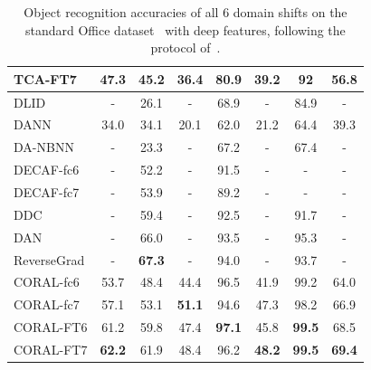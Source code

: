 \documentclass[letterpaper]{article}
\begin{document}
\begin{table}[t]
\begin{center}
{\begin{tabular}{|l||c|c|c|c|c|c|c|}
\hline
TCA-FT7	&47.3	&45.2	&36.4	&80.9	&39.2	&92 &56.8 \\
\hline
\hline
DLID	&-&	26.1&-&		68.9&-&84.9&-\\
\hline
DANN &34.0	&34.1&	20.1&	62.0&	21.2&	64.4&39.3\\
\hline
DA-NBNN	&-	&23.3&	-&	67.2&	-&	67.4&-\\
\hline
DECAF-fc6  &-	&52.2&	-&	91.5&	-&	-&-\\
\hline
DECAF-fc7  &-	&53.9&	-&	89.2&	-&	-&-\\
\hline
DDC	 &-	&59.4	&-	&92.5	&-	&91.7  &- \\
\hline
DAN	 &-	&66.0	&-	&93.5	&-	&95.3  &- \\
\hline
ReverseGrad	 &-	&\textbf{67.3}	&-	&94.0	&-	&93.7  &- \\
\hline
\hline
CORAL-fc6	&53.7	&48.4	&44.4	&96.5	&41.9	&99.2&64.0\\
\hline
CORAL-fc7	&57.1	&53.1	&\textbf{51.1}	&94.6	&47.3	&98.2&66.9\\
\hline
CORAL-FT6	&61.2	&59.8	&47.4	&\textbf{97.1}	&45.8	&\textbf{99.5}&68.5\\
\hline
CORAL-FT7	&\textbf{62.2}	&61.9	&48.4	&96.2	&\textbf{48.2}	&\textbf{99.5}&\textbf{69.4}\\
\hline
\end{tabular}
}
\end{center}
\caption{\small Object recognition accuracies of all 6 domain shifts on the standard Office dataset~\cite{saenko2010adapting} with deep features, following the protocol of~\cite{decaf,tzeng_arxiv15,reversegrad}. }
\label{tab:result_office10}
\end{table}
\end{document}
